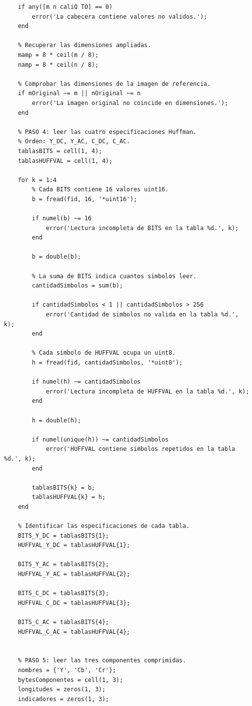 \documentclass[11pt,a4paper,oneside]{report}
\begin{document}
\begin{lstlisting}
    if any([m n caliQ TO] == 0)
        error('La cabecera contiene valores no validos.');
    end

    % Recuperar las dimensiones ampliadas.
    mamp = 8 * ceil(m / 8);
    namp = 8 * ceil(n / 8);

    % Comprobar las dimensiones de la imagen de referencia.
    if mOriginal ~= m || nOriginal ~= n
        error('La imagen original no coincide en dimensiones.');
    end

    % PASO 4: leer las cuatro especificaciones Huffman.
    % Orden: Y_DC, Y_AC, C_DC, C_AC.
    tablasBITS = cell(1, 4);
    tablasHUFFVAL = cell(1, 4);

    for k = 1:4
        % Cada BITS contiene 16 valores uint16.
        b = fread(fid, 16, '*uint16');

        if numel(b) ~= 16
            error('Lectura incompleta de BITS en la tabla %d.', k);
        end

        b = double(b);

        % La suma de BITS indica cuantos simbolos leer.
        cantidadSimbolos = sum(b);

        if cantidadSimbolos < 1 || cantidadSimbolos > 256
            error('Cantidad de simbolos no valida en la tabla %d.', k);
        end

        % Cada simbolo de HUFFVAL ocupa un uint8.
        h = fread(fid, cantidadSimbolos, '*uint8');

        if numel(h) ~= cantidadSimbolos
            error('Lectura incompleta de HUFFVAL en la tabla %d.', k);
        end

        h = double(h);

        if numel(unique(h)) ~= cantidadSimbolos
            error('HUFFVAL contiene simbolos repetidos en la tabla %d.', k);
        end

        tablasBITS{k} = b;
        tablasHUFFVAL{k} = h;
    end

    % Identificar las especificaciones de cada tabla.
    BITS_Y_DC = tablasBITS{1};
    HUFFVAL_Y_DC = tablasHUFFVAL{1};

    BITS_Y_AC = tablasBITS{2};
    HUFFVAL_Y_AC = tablasHUFFVAL{2};

    BITS_C_DC = tablasBITS{3};
    HUFFVAL_C_DC = tablasHUFFVAL{3};

    BITS_C_AC = tablasBITS{4};
    HUFFVAL_C_AC = tablasHUFFVAL{4};


    % PASO 5: leer las tres componentes comprimidas.
    nombres = {'Y', 'Cb', 'Cr'};
    bytesComponentes = cell(1, 3);
    longitudes = zeros(1, 3);
    indicadores = zeros(1, 3);


\end{lstlisting}
\end{document}
